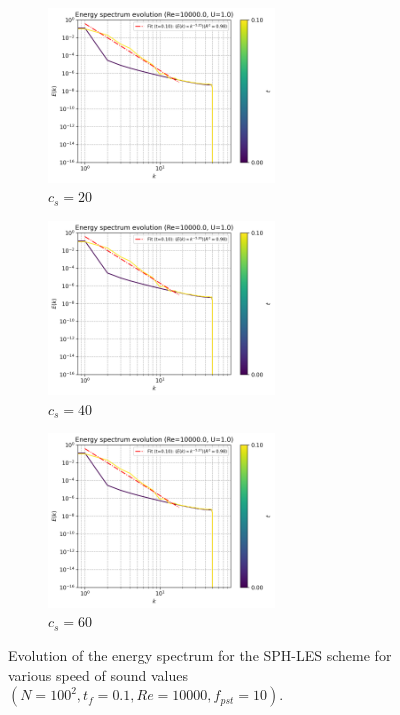 \begin{figure}[htbp!]
  \begin{subfigure}{7cm}
    \centering\includegraphics[width=6cm]{Code-Figures/okra2022/c0/c0_20_tait_pec_dtmul_1_nx_100_pst_10_re_10000_ok2022/energy_spectrum_evolution.png}
    \caption{$c_s=20$}
  \end{subfigure}
  \begin{subfigure}{7cm}
    \centering\includegraphics[width=6cm]{Code-Figures/okra2022/c0/c0_40_tait_pec_dtmul_1_nx_100_pst_10_re_10000_ok2022/energy_spectrum_evolution.png}
    \caption{$c_s=40$}
  \end{subfigure}
  \begin{subfigure}{7cm}
    \centering\includegraphics[width=6cm]{Code-Figures/okra2022/c0/c0_60_tait_pec_dtmul_1_nx_100_pst_10_re_10000_ok2022/energy_spectrum_evolution.png}
    \caption{$c_s=60$}
  \end{subfigure}
  \caption{Evolution of the energy spectrum for the SPH-LES scheme for various speed of sound values $(N=100^2, t_f=0.1, Re=10000, f_{pst}=10)$.}
  \label{fig:okra2022-c0-espec}
\end{figure}


